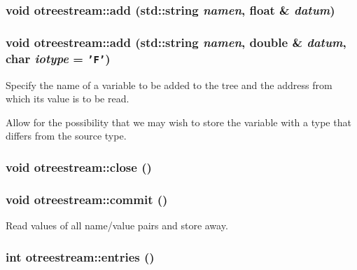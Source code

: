 \hypertarget{classotreestream_a6}{
\subsubsection[add]{\setlength{\rightskip}{0pt plus 5cm}void otreestream::add (std::string {\em namen}, float \& {\em datum})}}
\label{classotreestream_a6}


\hypertarget{classotreestream_a5}{
\subsubsection[add]{\setlength{\rightskip}{0pt plus 5cm}void otreestream::add (std::string {\em namen}, double \& {\em datum}, char {\em iotype} = {\tt 'F'})}}
\label{classotreestream_a5}


Specify the name of a variable to be added to the tree and the address from which its value is to be read. 

Allow for the possibility that we may wish to store the variable with a type that differs from the source type. \hypertarget{classotreestream_a16}{
\subsubsection[close]{\setlength{\rightskip}{0pt plus 5cm}void otreestream::close ()}}
\label{classotreestream_a16}


\hypertarget{classotreestream_a15}{
\subsubsection[commit]{\setlength{\rightskip}{0pt plus 5cm}void otreestream::commit ()}}
\label{classotreestream_a15}


Read values of all name/value pairs and store away. 

\hypertarget{classotreestream_a17}{
\subsubsection[entries]{\setlength{\rightskip}{0pt plus 5cm}int otreestream::entries ()}}
\label{classotreestream_a17}



